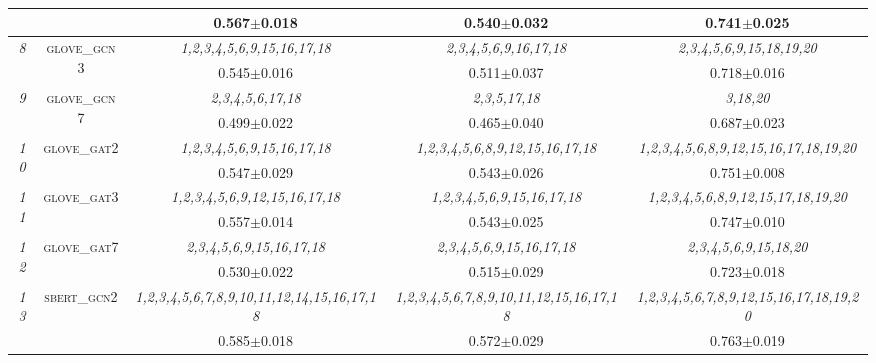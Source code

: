 \begin{table}[h]
{\begin{tabular}{ccccc}
        & & 0.567$\pm$0.018 \cellcolor{gray!10} & 0.540$\pm$0.032 & 0.741$\pm$0.025 \cellcolor{gray!10} \\ \hline
        \multirow{2}{*}{\textit{8}} & \multirow{2}{*}{\textsc{glove_gcn3}} & \textit{1,2,3,4,5,6,9,15,16,17,18} \cellcolor{gray!10} & \textit{2,3,4,5,6,9,16,17,18} & \textit{2,3,4,5,6,9,15,18,19,20} \cellcolor{gray!10} \\
        & & 0.545$\pm$0.016 \cellcolor{gray!10} & 0.511$\pm$0.037 & 0.718$\pm$0.016 \cellcolor{gray!10} \\ \hline
        \multirow{2}{*}{\textit{9}} & \multirow{2}{*}{\textsc{glove_gcn7}} & \textit{2,3,4,5,6,17,18} \cellcolor{gray!10} & \textit{2,3,5,17,18} & \textit{3,18,20} \cellcolor{gray!10} \\
        & & 0.499$\pm$0.022 \cellcolor{gray!10} & 0.465$\pm$0.040 & 0.687$\pm$0.023 \cellcolor{gray!10} \\ \hline
        \multirow{2}{*}{\textit{10}} & \multirow{2}{*}{\textsc{glove_gat2}} & \textit{1,2,3,4,5,6,9,15,16,17,18} \cellcolor{gray!10} & \textit{1,2,3,4,5,6,8,9,12,15,16,17,18} & \textit{1,2,3,4,5,6,8,9,12,15,16,17,18,19,20} \cellcolor{gray!10} \\
        & & 0.547$\pm$0.029 \cellcolor{gray!10} & 0.543$\pm$0.026 & 0.751$\pm$0.008 \cellcolor{gray!10} \\ \hline
        \multirow{2}{*}{\textit{11}} & \multirow{2}{*}{\textsc{glove_gat3}} & \textit{1,2,3,4,5,6,9,12,15,16,17,18} \cellcolor{gray!10} & \textit{1,2,3,4,5,6,9,15,16,17,18} & \textit{1,2,3,4,5,6,8,9,12,15,17,18,19,20} \cellcolor{gray!10} \\
        & & 0.557$\pm$0.014 \cellcolor{gray!10} & 0.543$\pm$0.025 & 0.747$\pm$0.010 \cellcolor{gray!10} \\ \hline
        \multirow{2}{*}{\textit{12}} & \multirow{2}{*}{\textsc{glove_gat7}} & \textit{2,3,4,5,6,9,15,16,17,18} \cellcolor{gray!10} & \textit{2,3,4,5,6,9,15,16,17,18} & \textit{2,3,4,5,6,9,15,18,20} \cellcolor{gray!10} \\
        & & 0.530$\pm$0.022 \cellcolor{gray!10} & 0.515$\pm$0.029 & 0.723$\pm$0.018 \cellcolor{gray!10} \\ \hline
        \multirow{2}{*}{\textit{13}} & \multirow{2}{*}{\textsc{sbert_gcn2}} & \textit{1,2,3,4,5,6,7,8,9,10,11,12,14,15,16,17,18} \cellcolor{gray!10} & \textit{1,2,3,4,5,6,7,8,9,10,11,12,15,16,17,18} & \textit{1,2,3,4,5,6,7,8,9,12,15,16,17,18,19,20} \cellcolor{gray!10} \\
        & & 0.585$\pm$0.018 \cellcolor{gray!10} & 0.572$\pm$0.029 & 0.763$\pm$0.019 \cellcolor{gray!10} \\ \hline

\end{tabular}}
\end{table}
